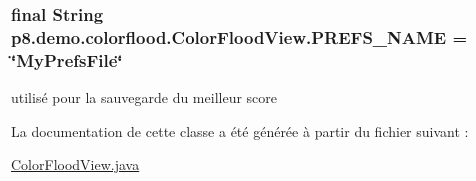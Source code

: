 \subsubsection[{P\+R\+E\+F\+S\+\_\+\+N\+A\+M\+E}]{\setlength{\rightskip}{0pt plus 5cm}final String p8.\+demo.\+colorflood.\+Color\+Flood\+View.\+P\+R\+E\+F\+S\+\_\+\+N\+A\+M\+E = \char`\"{}My\+Prefs\+File\char`\"{}\hspace{0.3cm}{\ttfamily [static]}}\label{classp8_1_1demo_1_1colorflood_1_1_color_flood_view_a4d0c7b140ad6fef18d29c6fc088b6471}
utilisé pour la sauvegarde du meilleur score 

La documentation de cette classe a été générée à partir du fichier suivant \+:\begin{DoxyCompactItemize}
\item 
\hyperlink{_color_flood_view_8java}{Color\+Flood\+View.\+java}\end{DoxyCompactItemize}
